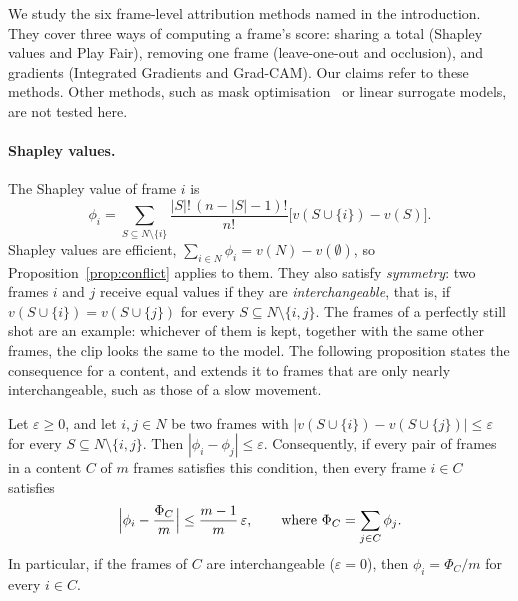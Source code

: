 
We study the six frame-level attribution methods named in the introduction.
They cover three ways of computing a frame's score: sharing a total (Shapley values and Play Fair), removing one frame (leave-one-out and occlusion), and gradients (Integrated Gradients and Grad-CAM).
Our claims refer to these methods.
Other methods, such as mask optimisation~\citep{ruth_c__fong_7e902699, zhenqiang_li_45594fd6} or linear surrogate models, are not tested here.

\paragraph{Shapley values.}
The Shapley value of frame $i$ is
\begin{equation}
  \phi_i = \sum_{S \subseteq N \setminus \{i\}} \frac{|S|!\,(n - |S| - 1)!}{n!} \bigl[ v(S \cup \{i\}) - v(S) \bigr].
\end{equation}
Shapley values are efficient, $\sum_{i \in N} \phi_i = v(N) - v(\emptyset)$, so Proposition~\ref{prop:conflict} applies to them.
They also satisfy \emph{symmetry}: two frames $i$ and $j$ receive equal values if they are \emph{interchangeable}, that is, if $v(S \cup \{i\}) = v(S \cup \{j\})$ for every $S \subseteq N \setminus \{i, j\}$.
The frames of a perfectly still shot are an example: whichever of them is kept, together with the same other frames, the clip looks the same to the model.
The following proposition states the consequence for a content, and extends it to frames that are only nearly interchangeable, such as those of a slow movement.

\begin{proposition}
\label{prop:split}
Let $\varepsilon \ge 0$, and let $i, j \in N$ be two frames with
$|v(S \cup \{i\}) - v(S \cup \{j\})| \le \varepsilon$ for every $S \subseteq N \setminus \{i, j\}$.
Then $|\phi_i - \phi_j| \le \varepsilon$.
Consequently, if every pair of frames in a content $C$ of $m$ frames satisfies this condition, then every frame $i \in C$ satisfies
\begin{equation}
  \Bigl| \phi_i - \frac{\Phi_C}{m} \Bigr| \le \frac{m - 1}{m}\, \varepsilon,
  \qquad \text{where } \Phi_C = \sum_{j \in C} \phi_j .
\end{equation}
In particular, if the frames of $C$ are interchangeable ($\varepsilon = 0$), then $\phi_i = \Phi_C / m$ for every $i \in C$.
\end{proposition}

